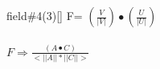 \documentclass{article}
\begin{document}
field\#4(3)[] F= $(\frac{V}{|V|})\bullet(\frac{U}{|U|})$\\
\\
$F \Longrightarrow \frac{(A \bullet C)}{<||A||*||C||>}$\\

  
\end{document}
